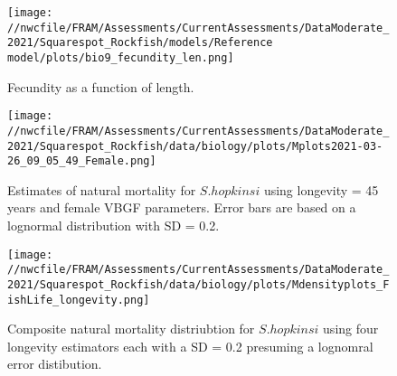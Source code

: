 \documentclass[11pt,
  english,
  a4paper,
]{article}
\begin{document}
\tagmcend\tagstructend


\begin{figure}
\centering
\texttt{[image: //nwcfile/FRAM/Assessments/CurrentAssessments/DataModerate\_2021/Squarespot\_Rockfish/models/Reference model/plots/bio9\_fecundity\_len.png]}
\caption{Fecundity as a function of length.\label{fig:fecundity}}
\end{figure}

\tagmcend\tagstructend


\begin{figure}
\centering
\texttt{[image: //nwcfile/FRAM/Assessments/CurrentAssessments/DataModerate\_2021/Squarespot\_Rockfish/data/biology/plots/Mplots2021-03-26\_09\_05\_49\_Female.png]}
\caption{Estimates of natural mortality for {\(S. hopkinsi\)\leavevmode\tagmcend\tagstructend} using longevity = 45 years and female VBGF parameters. Error bars are based on a lognormal distribution with SD = 0.2.\label{fig:M_female}}
\end{figure}

\tagmcend\tagstructend


\begin{figure}
\centering
\texttt{[image: //nwcfile/FRAM/Assessments/CurrentAssessments/DataModerate\_2021/Squarespot\_Rockfish/data/biology/plots/Mdensityplots\_FishLife\_longevity.png]}
\caption{Composite natural mortality distriubtion for {\(S. hopkinsi\)\leavevmode\tagmcend\tagstructend} using four longevity estimators each with a SD = 0.2 presuming a lognomral error distibution.\label{fig:M_composite_dists}}
\end{figure}

\tagmcend\tagstructend
\end{document}
